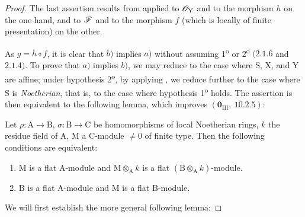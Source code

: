 \begin{proof}
The last assertion results from  applied to $\mathscr{O}_\mathrm{Y}$ and to the morphism $h$ on the one hand, and to $\mathscr{F}$ and to the morphism $f$ (which is locally of finite presentation) on the other.

As $g=h\circ f$, it is clear that $b)$ implies $a)$ without assuming 1\textsuperscript{o} or 2\textsuperscript{o} $(2.1.6$ and $2.1.4)$. To prove that $a)$ implies $b)$, we may reduce to the case where $\mathrm{S}$, $\mathrm{X}$, and $\mathrm{Y}$ are affine; under hypothesis 2\textsuperscript{o}, by applying , we reduce further to the case where $\mathrm{S}$ is \emph{Noetherian}, that is, to the case where hypothesis 1\textsuperscript{o} holds. The assertion is then equivalent to the following lemma, which improves $(\mathbf{0}_{\mathrm{III}},~10.2.5)$:

\begin{lemma}[11.3.10.1]
\label{IV.11.3.10.1}
Let $\rho:\mathrm{A}\to\mathrm{B}$, $\sigma:\mathrm{B}\to\mathrm{C}$ be homomorphisms of local Noetherian rings, $k$ the residue field of $\mathrm{A}$, $\mathrm{M}$ a $\mathrm{C}$-module $\neq 0$ of finite type. Then the following conditions are equivalent:
\begin{enumerate}[label=\emph{\alph*)}]
  \item $\mathrm{M}$ is a flat $\mathrm{A}$-module and $\mathrm{M}\otimes_\mathrm{A} k$ is a flat $(\mathrm{B}\otimes_\mathrm{A} k)$-module.
  \item $\mathrm{B}$ is a flat $\mathrm{A}$-module and $\mathrm{M}$ is a flat $\mathrm{B}$-module.
\end{enumerate}
\end{lemma}

We will first establish the more general following lemma:


\end{proof}
